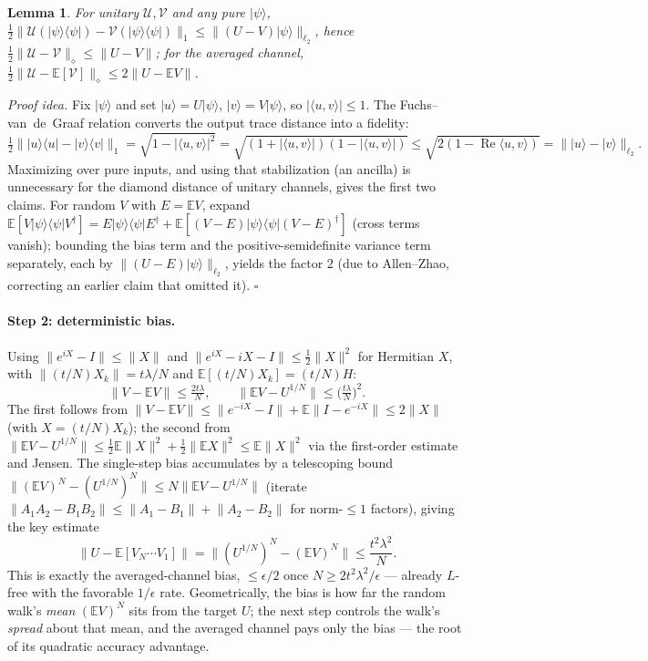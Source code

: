 ﻿\documentclass[12pt]{article}
\theoremstyle{plain}
\newtheorem{lemma}{Lemma}
\theoremstyle{definition}
\newcommand{\norm}[1]{\lVert #1 \rVert}
\newcommand{\dnorm}[1]{\lVert #1 \rVert_{\diamond}}
\newcommand{\tnorm}[1]{\lVert #1 \rVert_{1}}
\newcommand{\ltwo}[1]{\lVert #1 \rVert_{\ell_2}}
\newcommand{\E}{\mathbb{E}}
\newcommand{\ket}[1]{\lvert #1 \rangle}
\newcommand{\ketbra}[1]{\lvert #1 \rangle\!\langle #1 \rvert}
\renewcommand{\Re}{\operatorname{Re}}
\newcommand{\Uchan}{\mathcal{U}}
\newcommand{\Vchan}{\mathcal{V}}
\newcommand{\half}{\tfrac{1}{2}}
\begin{document}
	\begin{lemma}\label{lem:reduction}
		For unitary $\Uchan,\Vchan$ and any pure $\ket\psi$,
		$\half\tnorm{\Uchan(\ketbra\psi)-\Vchan(\ketbra\psi)}\le\ltwo{(U-V)\ket\psi}$, hence
		$\half\dnorm{\Uchan-\Vchan}\le\norm{U-V}$; for the averaged channel,
		$\half\dnorm{\Uchan-\E[\Vchan]}\le2\norm{U-\E V}$.
	\end{lemma}
	\noindent\emph{Proof idea.} Fix $\ket\psi$ and set $\ket u=U\ket\psi$, $\ket v=V\ket\psi$, so
	$|\langle u,v\rangle|\le1$. The Fuchs--van~de~Graaf relation converts the output trace
	distance into a fidelity:
	\[
	\half\tnorm{\ketbra u-\ketbra v}=\sqrt{1-|\langle u,v\rangle|^2}=\sqrt{(1+|\langle u,v\rangle|)(1-|\langle u,v\rangle|)}\le\sqrt{2(1-\Re\langle u,v\rangle)}=\ltwo{\ket u-\ket v}.
	\]
	Maximizing over pure inputs, and using that stabilization (an ancilla) is unnecessary for the
	diamond distance of unitary channels, gives the first two claims. For random $V$ with $E=\E V$,
	expand $\E[V\ketbra\psi V^\dagger]=E\ketbra\psi E^\dagger+\E[(V-E)\ketbra\psi(V-E)^\dagger]$
	(cross terms vanish); bounding the bias term and the positive-semidefinite variance term
	separately, each by $\ltwo{(U-E)\ket\psi}$, yields the factor $2$ (due to Allen--Zhao,
	correcting an earlier claim that omitted it). \hfill$\square$
	
	\paragraph{Step 2: deterministic bias.}
	Using $\norm{e^{iX}-I}\le\norm{X}$ and $\norm{e^{iX}-iX-I}\le\half\norm{X}^2$ for Hermitian
	$X$, with $\norm{(t/N)X_k}=t\lambda/N$ and $\E[(t/N)X_k]=(t/N)H$:
	\begin{equation}
		\norm{V-\E V}\le\tfrac{2t\lambda}{N},\qquad
		\norm{\E V-U^{1/N}}\le\big(\tfrac{t\lambda}{N}\big)^2 .
		\label{eq:singlestep}
	\end{equation}
	The first follows from $\norm{V-\E V}\le\norm{e^{-iX}-I}+\E\norm{I-e^{-iX}}\le2\norm{X}$ (with
	$X=(t/N)X_k$); the second from $\norm{\E V-U^{1/N}}\le\tfrac12\E\norm{X}^2+\tfrac12\norm{\E X}^2\le\E\norm{X}^2$
	via the first-order estimate and Jensen. The single-step bias accumulates by a telescoping
	bound $\norm{(\E V)^N-(U^{1/N})^N}\le N\norm{\E V-U^{1/N}}$ (iterate
	$\norm{A_1A_2-B_1B_2}\le\norm{A_1-B_1}+\norm{A_2-B_2}$ for norm-$\le1$ factors), giving the key
	estimate
	\begin{equation}
		\norm{U-\E[V_N\cdots V_1]}=\norm{(U^{1/N})^N-(\E V)^N}\le\frac{t^2\lambda^2}{N}.
		\label{eq:bias}
	\end{equation}
	This is exactly the averaged-channel bias, $\le\epsilon/2$ once $N\ge2t^2\lambda^2/\epsilon$
	--- already $L$-free with the favorable $1/\epsilon$ rate. Geometrically, the bias is how far
	the random walk's \emph{mean} $(\E V)^N$ sits from the target $U$; the next step controls the
	walk's \emph{spread} about that mean, and the averaged channel pays only the bias --- the root
	of its quadratic accuracy advantage.
	
\end{document}
